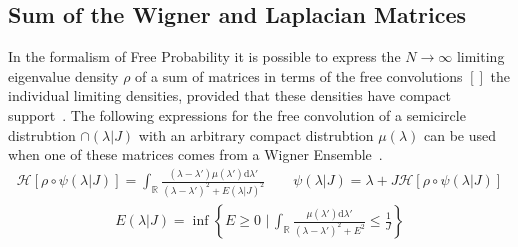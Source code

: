 \documentclass{article}[12pt]
\numberwithin{equation}{section}
\begin{document}
\subsection{Sum of the Wigner and Laplacian Matrices}
In the formalism of Free Probability it is possible to express the
$N\rightarrow\infty$ limiting eigenvalue density $\rho$ of a sum of
matrices in terms of the free convolutions $[]$ the individual limiting
densities, provided that these densities have compact support~\cite{}.
The following expressions for the free convolution of a semicircle distrubtion
$\cap(\lambda|J)$ with an arbitrary compact distrubtion $\mu(\lambda)$ can be
used when one of these matrices comes from a Wigner Ensemble~\cite{Biane_1997}.
\begin{align}
  \mathcal{H}[\rho\circ\psi(\lambda|J)]=
  \int_{\mathbb{R}}\frac{(\lambda-\lambda')\mu(\lambda')\mathrm{d}\lambda'}{(\lambda-\lambda')^2+E(\lambda|J)^2}
  \qquad
  \psi(\lambda|J)=
  \lambda+J\mathcal{H}[\rho\circ\psi(\lambda|J)]
\end{align}
\vspace{-30pt}
\begin{align}
  E(\lambda|J)=\inf
  \left\{
  E\geq 0\,\,\bigg|\,
  \int_{\mathbb{R}}\frac{\mu(\lambda')\mathrm{d}\lambda'}{(\lambda-\lambda')^2+E^2}
  \leq\frac{1}{J}
  \right\}
\end{align}
\end{document}
